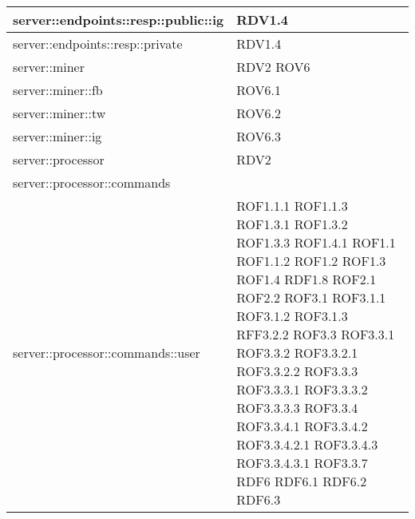 \begin{center}
\begin{longtable}{| p{9cm} | p{4cm} |}
\hline
server::endpoints::resp::public::ig  &  RDV1.4 \\
\hline
server::endpoints::resp::private  &  RDV1.4 \\
\hline
server::miner  & RDV2 \newline ROV6 \\
\hline
server::miner::fb  &  ROV6.1 \\
\hline
server::miner::tw  &  ROV6.2 \\
\hline
server::miner::ig  &  ROV6.3 \\
\hline
server::processor  & RDV2 \\
\hline
server::processor::commands  &  \\
\hline
server::processor::commands::user  &  ROF1.1.1 \newline ROF1.1.3 \newline ROF1.3.1 \newline ROF1.3.2 \newline ROF1.3.3 \newline ROF1.4.1 \newline ROF1.1 \newline ROF1.1.2 \newline ROF1.2 \newline ROF1.3 \newline ROF1.4 \newline RDF1.8 \newline ROF2.1 \newline ROF2.2 \newline ROF3.1 \newline ROF3.1.1 \newline ROF3.1.2 \newline ROF3.1.3 \newline RFF3.2.2 \newline ROF3.3 \newline ROF3.3.1 \newline ROF3.3.2 \newline ROF3.3.2.1 \newline ROF3.3.2.2 \newline ROF3.3.3 \newline ROF3.3.3.1 \newline ROF3.3.3.2 \newline ROF3.3.3.3 \newline ROF3.3.4 \newline ROF3.3.4.1 \newline ROF3.3.4.2 \newline ROF3.3.4.2.1 \newline ROF3.3.4.3 \newline ROF3.3.4.3.1 \newline ROF3.3.7 \newline RDF6 \newline RDF6.1 \newline RDF6.2 \newline RDF6.3 \\

\end{longtable}
\end{center}
